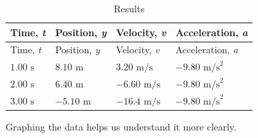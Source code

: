 \documentclass[
]{book}
\begin{document}
\begin{longtable}[]{@{}llll@{}}
\caption{{Results}}\tabularnewline
\toprule
Time, \emph{t} & Position, \emph{y} & Velocity, \emph{v} & Acceleration, \emph{a} \\
\midrule
\endfirsthead
\toprule
Time, \emph{t} & Position, \emph{y} & Velocity, \emph{v} & Acceleration, \emph{a} \\
\midrule
\endhead
\({1\text{.}\text{00\ s}}{}\) & \({8\text{.}\text{10\ m}}{}\) & \({3\text{.}\text{20\ m/s}}{}\) & \({{- 9}\text{.}\text{80\ m/s}^{2}}{}\) \\
\({2\text{.}\text{00\ s}}{}\) & \({6\text{.}\text{40\ m}}{}\) & \({{- 6}\text{.}\text{60\ m/s}}{}\) & \({{- 9}\text{.}\text{80\ m/s}^{2}}{}\) \\
\({3\text{.}\text{00\ s}}{}\) & \({{- 5}\text{.}\text{10\ m}}{}\) & \({{- \text{16}}\text{.}\text{4\ m/s}}{}\) & \({{- 9}\text{.}\text{80\ m/s}^{2}}{}\) \\
\bottomrule
\end{longtable}

Graphing the data helps us understand it more clearly.
\end{document}
